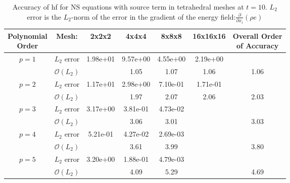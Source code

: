 \begin{table}[htbp]
\centering
\begin{tabular}{ c c c c c c c} 
  
 \specialcell{Polynomial\vspace{0.2cm}\\ Order}  & Mesh: & 2x2x2 & 4x4x4 & 8x8x8 & 16x16x16 & \specialcell{Overall Order \vspace{0.2cm}\\ of Accuracy} \\ 
 \hline 
 \multirow{2}{*}{$p = 1$} & $L_2$ error & 1.98e+01 & 9.57e+00 & 4.55e+00 & 2.19e+00 &   \\ 
  
   & $\mathcal{O}(L_2)$ &   & 1.05 & 1.07 & 1.06 & 1.06 \\ 
 \hline 
 \multirow{2}{*}{$p = 2$} & $L_2$ error & 1.17e+01 & 2.98e+00 & 7.10e-01 & 1.71e-01 &   \\ 
  
   & $\mathcal{O}(L_2)$ &   & 1.97 & 2.07 & 2.06 & 2.03 \\ 
 \hline 
 \multirow{2}{*}{$p = 3$} & $L_2$ error & 3.17e+00 & 3.81e-01 & 4.73e-02 &   &   \\ 
  
   & $\mathcal{O}(L_2)$ &   & 3.06 & 3.01 &   & 3.03 \\ 
 \hline 
 \multirow{2}{*}{$p = 4$} & $L_2$ error & 5.21e-01 & 4.27e-02 & 2.69e-03 &   &   \\ 
  
   & $\mathcal{O}(L_2)$ &   & 3.61 & 3.99 &   & 3.80 \\ 
 \hline 
 \multirow{2}{*}{$p = 5$} & $L_2$ error & 3.20e+00 & 1.88e-01 & 4.79e-03 &   &   \\ 
  
   & $\mathcal{O}(L_2)$ &   & 4.09 & 5.29 &   & 4.69 \\ 
 \hline 
 \end{tabular}
\caption{Accuracy of \gls{hf} for NS equations with source term in tetrahedral meshes at $t = 10$. $L_2$ error is the $L_2$-norm of the error in the gradient of the energy field:$\frac{\partial}{\partial x_i} (\rho e)$}
\label{table:tetsError2} 
 \end{table}
